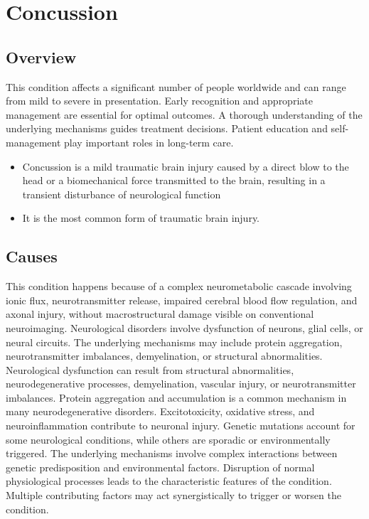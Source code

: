 \chapter{Concussion}
\label{sec:Concussion}

\section{Overview}
This condition affects a significant number of people worldwide and can range from mild to severe in presentation. Early recognition and appropriate management are essential for optimal outcomes. A thorough understanding of the underlying mechanisms guides treatment decisions. Patient education and self-management play important roles in long-term care.

\begin{itemize}[noitemsep]
  \item Concussion is a mild traumatic brain injury caused by a direct blow to the head or a biomechanical force transmitted to the brain, resulting in a transient disturbance of neurological function
  \item It is the most common form of traumatic brain injury.
\end{itemize}
\section{Causes}
This condition happens because of a complex neurometabolic cascade involving ionic flux, neurotransmitter release, impaired cerebral blood flow regulation, and axonal injury, without macrostructural damage visible on conventional neuroimaging. Neurological disorders involve dysfunction of neurons, glial cells, or neural circuits. The underlying mechanisms may include protein aggregation, neurotransmitter imbalances, demyelination, or structural abnormalities. Neurological dysfunction can result from structural abnormalities, neurodegenerative processes, demyelination, vascular injury, or neurotransmitter imbalances. Protein aggregation and accumulation is a common mechanism in many neurodegenerative disorders. Excitotoxicity, oxidative stress, and neuroinflammation contribute to neuronal injury. Genetic mutations account for some neurological conditions, while others are sporadic or environmentally triggered. The underlying mechanisms involve complex interactions between genetic predisposition and environmental factors. Disruption of normal physiological processes leads to the characteristic features of the condition. Multiple contributing factors may act synergistically to trigger or worsen the condition.
